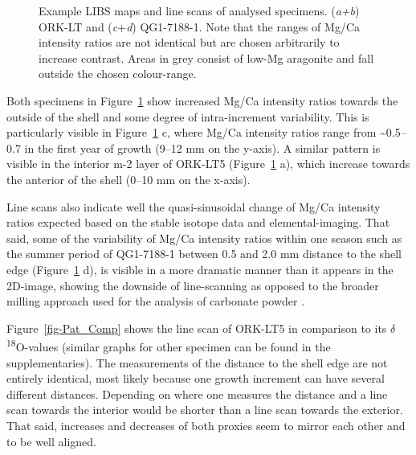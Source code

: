 \documentclass[
  authoryear,
  preprint,
  3p]{elsarticle}
\begin{document}
\begin{figure}[H]


\caption{\label{fig-Pat_LIBS}Example LIBS maps and line scans of
analysed specimens. (\emph{a+b}) ORK-LT and (\emph{c}+\emph{d})
QG1-7188-1. Note that the ranges of Mg/Ca intensity ratios are not
identical but are chosen arbitrarily to increase contrast. Areas in grey
consist of low-Mg aragonite and fall outside the chosen colour-range.}

\end{figure}%

Both specimens in Figure~\ref{fig-Pat_LIBS} show increased Mg/Ca
intensity ratios towards the outside of the shell and some degree of
intra-increment variability. This is particularly visible in
Figure~\ref{fig-Pat_LIBS} c, where Mg/Ca intensity ratios range from
\textasciitilde0.5--0.7 in the first year of growth (9--12 mm on the
y-axis). A similar pattern is visible in the interior m-2 layer of
ORK-LT5 (Figure~\ref{fig-Pat_LIBS} a), which increase towards the
anterior of the shell (0--10 mm on the x-axis).

Line scans also indicate well the quasi-sinusoidal change of Mg/Ca
intensity ratios expected based on the stable isotope data and
elemental-imaging. That said, some of the variability of Mg/Ca intensity
ratios within one season such as the summer period of QG1-7188-1 between
0.5 and 2.0 mm distance to the shell edge (Figure~\ref{fig-Pat_LIBS} d),
is visible in a more dramatic manner than it appears in the 2D-image,
showing the downside of line-scanning as opposed to the broader milling
approach used for the analysis of carbonate powder
\citep{Ferguson2011-zl}.

Figure~\ref{fig-Pat_Comp} shows the line scan of ORK-LT5 in comparison
to its \(\delta\)\textsuperscript{18}O-values (similar graphs for other
specimen can be found in the supplementaries). The measurements of the
distance to the shell edge are not entirely identical, most likely
because one growth increment can have several different distances.
Depending on where one measures the distance and a line scan towards the
interior would be shorter than a line scan towards the exterior. That
said, increases and decreases of both proxies seem to mirror each other
and to be well aligned.
\end{document}
